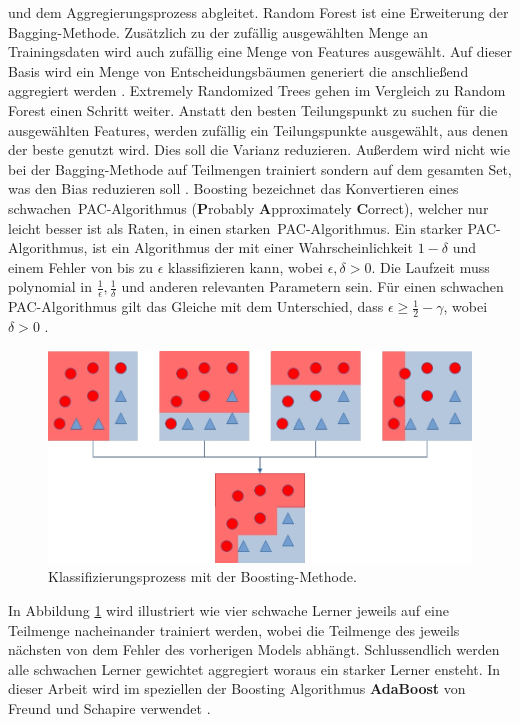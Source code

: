 und dem Aggregierungsprozess abgleitet.
\newline
\newline
Random Forest ist eine Erweiterung der Bagging-Methode. Zusätzlich zu der zufällig ausgewählten Menge an Trainingsdaten wird auch zufällig eine Menge von Features ausgewählt. Auf dieser Basis wird ein Menge von
Entscheidungsbäumen generiert die anschließend aggregiert werden \cite{breiman2001random}.
\newline
\newline
Extremely Randomized Trees gehen im Vergleich zu Random Forest einen Schritt weiter. Anstatt den besten Teilungspunkt zu suchen für die ausgewählten Features, werden zufällig ein Teilungspunkte ausgewählt, aus denen
der beste genutzt wird. Dies soll die Varianz reduzieren. Außerdem wird nicht wie bei der Bagging-Methode auf Teilmengen trainiert sondern auf dem gesamten Set, was den Bias reduzieren soll \cite{geurts2006extremely}.
\newline
\newline
Boosting bezeichnet das Konvertieren eines \glqq schwachen\grqq\ PAC-Algorithmus (\textbf{P}robably \textbf{A}pproximately \textbf{C}orrect), welcher nur leicht besser ist als Raten, in einen \glqq starken\grqq\
PAC-Algorithmus. Ein starker PAC-Algorithmus, ist ein Algorithmus der mit einer Wahrscheinlichkeit $1 - \delta$ und einem Fehler von bis zu $\epsilon$ klassifizieren kann, wobei $\epsilon, \delta > 0$. Die
Laufzeit muss polynomial in $\frac{1}{\epsilon}, \frac{1}{\delta}$ und anderen relevanten Parametern sein. Für einen schwachen PAC-Algorithmus gilt das Gleiche
mit dem Unterschied, dass $\epsilon \geq \frac{1}{2} - \gamma$, wobei $\delta > 0$ \cite{freund1997decision}.
\newpage
\begin{figure}
    \centering
    \includegraphics[width=\linewidth]{images/boosting.jpg}
    \caption{Klassifizierungsprozess mit der Boosting-Methode.}
    \label{fig:boosting}
\end{figure}
In Abbildung \ref{fig:boosting} wird illustriert wie vier schwache Lerner jeweils auf eine Teilmenge nacheinander trainiert werden, wobei die Teilmenge des jeweils nächsten von dem Fehler des vorherigen Models
abhängt. Schlussendlich werden alle schwachen Lerner gewichtet aggregiert woraus ein starker Lerner ensteht. In dieser Arbeit wird im speziellen der Boosting Algorithmus \textbf{AdaBoost} von Freund
und Schapire verwendet \cite{freund1997decision}.